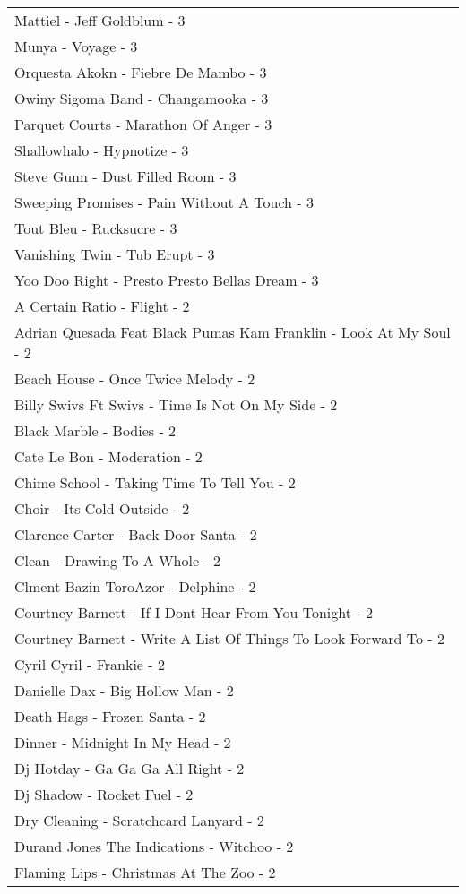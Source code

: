 \documentclass[
]{article}
\begin{document}
\begin{longtable}{l}
Mattiel - Jeff Goldblum - 3 \\ 
Munya - Voyage - 3 \\ 
Orquesta Akokn - Fiebre De Mambo - 3 \\ 
Owiny Sigoma Band - Changamooka - 3 \\ 
Parquet Courts - Marathon Of Anger - 3 \\ 
Shallowhalo - Hypnotize - 3 \\ 
Steve Gunn - Dust Filled Room - 3 \\ 
Sweeping Promises - Pain Without A Touch - 3 \\ 
Tout Bleu - Rucksucre - 3 \\ 
Vanishing Twin - Tub Erupt - 3 \\ 
Yoo Doo Right - Presto Presto Bellas Dream - 3 \\ 
A Certain Ratio - Flight - 2 \\ 
Adrian Quesada Feat Black Pumas Kam Franklin - Look At My Soul - 2 \\ 
Beach House - Once Twice Melody - 2 \\ 
Billy Swivs Ft Swivs - Time Is Not On My Side - 2 \\ 
Black Marble - Bodies - 2 \\ 
Cate Le Bon - Moderation - 2 \\ 
Chime School - Taking Time To Tell You - 2 \\ 
Choir - Its Cold Outside - 2 \\ 
Clarence Carter - Back Door Santa - 2 \\ 
Clean - Drawing To A Whole - 2 \\ 
Clment Bazin ToroAzor - Delphine - 2 \\ 
Courtney Barnett - If I Dont Hear From You Tonight - 2 \\ 
Courtney Barnett - Write A List Of Things To Look Forward To - 2 \\ 
Cyril Cyril - Frankie - 2 \\ 
Danielle Dax - Big Hollow Man - 2 \\ 
Death Hags - Frozen Santa - 2 \\ 
Dinner - Midnight In My Head - 2 \\ 
Dj Hotday - Ga Ga Ga All Right - 2 \\ 
Dj Shadow - Rocket Fuel - 2 \\ 
Dry Cleaning - Scratchcard Lanyard - 2 \\ 
Durand Jones The Indications - Witchoo - 2 \\ 
Flaming Lips - Christmas At The Zoo - 2 \\ 

\end{longtable}
\end{document}
